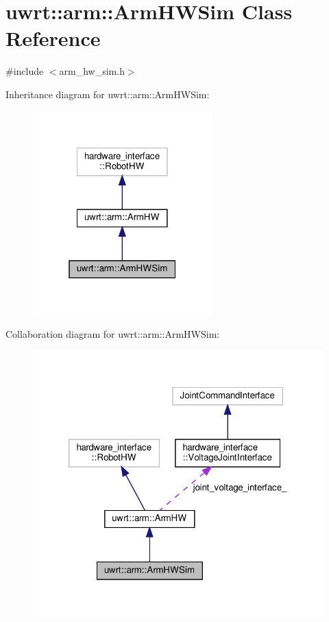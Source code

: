 \hypertarget{classuwrt_1_1arm_1_1_arm_h_w_sim}{}\section{uwrt\+:\+:arm\+:\+:Arm\+H\+W\+Sim Class Reference}
\label{classuwrt_1_1arm_1_1_arm_h_w_sim}


{\ttfamily \#include $<$arm\+\_\+hw\+\_\+sim.\+h$>$}



Inheritance diagram for uwrt\+:\+:arm\+:\+:Arm\+H\+W\+Sim\+:
\nopagebreak
\begin{figure}[H]
\begin{center}
\leavevmode
\includegraphics[width=196pt]{classuwrt_1_1arm_1_1_arm_h_w_sim__inherit__graph}
\end{center}
\end{figure}


Collaboration diagram for uwrt\+:\+:arm\+:\+:Arm\+H\+W\+Sim\+:
\nopagebreak
\begin{figure}[H]
\begin{center}
\leavevmode
\includegraphics[width=320pt]{classuwrt_1_1arm_1_1_arm_h_w_sim__coll__graph}
\end{center}
\end{figure}
